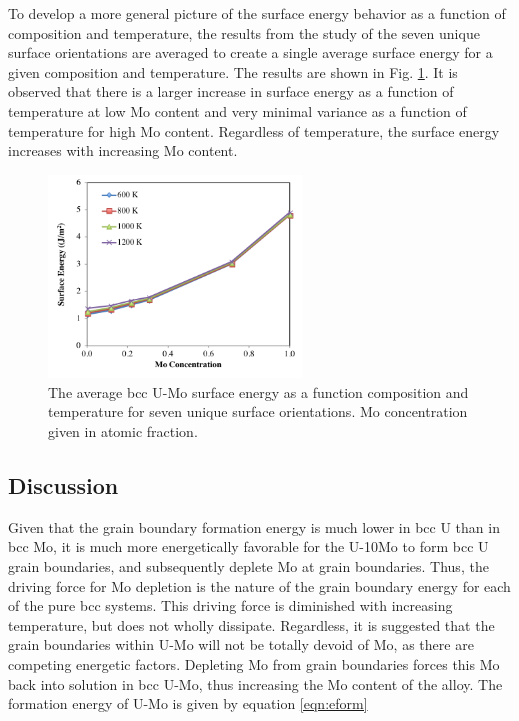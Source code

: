 \documentclass[review]{elsarticle}
\begin{document}
\FloatBarrier

To develop a more general picture of the surface energy behavior as a function of composition and temperature, the results from the study of the seven unique surface orientations are averaged to create a single average surface energy for a given composition and temperature. The results are shown in Fig. \ref{fig:avgvsmoS}. It is observed that there is a larger increase in surface energy as a function of temperature at low Mo content and very minimal variance as a function of temperature for high Mo content. Regardless of temperature, the surface energy increases with increasing Mo content. 

\begin{figure}[h]
 \centering
 \includegraphics[width=0.6\textwidth]{umoavgsurfA.png} 
 \caption{The average bcc U-Mo surface energy as a function composition and temperature for seven unique surface orientations. Mo concentration given in atomic fraction.}
 \label{fig:avgvsmoS}
\end{figure}

\FloatBarrier

\subsection{Discussion}

Given that the grain boundary formation energy is much lower in bcc U than in bcc Mo, it is much more energetically favorable for the U-10Mo to form bcc U grain boundaries, and subsequently deplete Mo at grain boundaries. Thus, the driving force for Mo depletion is the nature of the grain boundary energy for each of the pure bcc systems. This driving force is diminished with increasing temperature, but does not wholly dissipate. Regardless, it is suggested that the grain boundaries within U-Mo will not be totally devoid of Mo, as there are competing energetic factors. Depleting Mo from grain boundaries forces this Mo back into solution in bcc U-Mo, thus increasing the Mo content of the alloy. The formation energy of U-Mo is given by equation \ref{eqn:eform}
\end{document}
